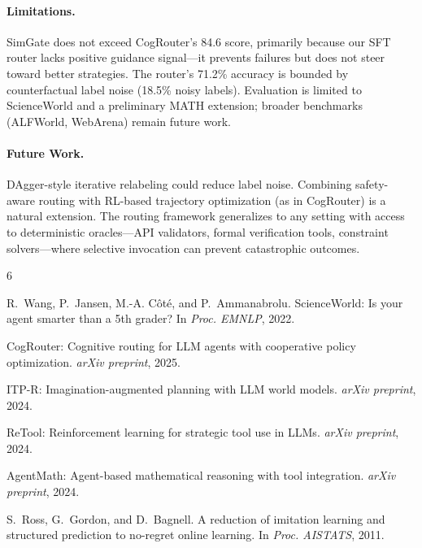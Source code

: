 \documentclass[11pt,a4paper]{article}
\begin{document}
\paragraph{Limitations.} SimGate does not exceed CogRouter's 84.6 score, primarily because our SFT router lacks positive guidance signal---it prevents failures but does not steer toward better strategies. The router's 71.2\% accuracy is bounded by counterfactual label noise (18.5\% noisy labels). Evaluation is limited to ScienceWorld and a preliminary MATH extension; broader benchmarks (ALFWorld, WebArena) remain future work.

\paragraph{Future Work.} DAgger-style iterative relabeling could reduce label noise. Combining safety-aware routing with RL-based trajectory optimization (as in CogRouter) is a natural extension. The routing framework generalizes to any setting with access to deterministic oracles---API validators, formal verification tools, constraint solvers---where selective invocation can prevent catastrophic outcomes.

\begin{thebibliography}{6}

R.~Wang, P.~Jansen, M.-A. C\^{o}t\'{e}, and P.~Ammanabrolu.
ScienceWorld: Is your agent smarter than a 5th grader?
In \emph{Proc. EMNLP}, 2022.

CogRouter: Cognitive routing for LLM agents with cooperative policy optimization.
\emph{arXiv preprint}, 2025.

ITP-R: Imagination-augmented planning with LLM world models.
\emph{arXiv preprint}, 2024.

ReTool: Reinforcement learning for strategic tool use in LLMs.
\emph{arXiv preprint}, 2024.

AgentMath: Agent-based mathematical reasoning with tool integration.
\emph{arXiv preprint}, 2024.

S.~Ross, G.~Gordon, and D.~Bagnell.
A reduction of imitation learning and structured prediction to no-regret online learning.
In \emph{Proc. AISTATS}, 2011.

\end{thebibliography}
\end{document}
